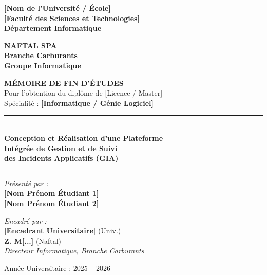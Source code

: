 \begin{titlepage}
\begin{center}

\begin{minipage}{0.45\textwidth}
    \begin{flushleft}
        \textbf{[Nom de l'Université / École]} \\
        \textbf{[Faculté des Sciences et Technologies]} \\
        \textbf{Département Informatique}
    \end{flushleft}
\end{minipage}
\hfill
\begin{minipage}{0.45\textwidth}
    \begin{flushright}
        \textbf{NAFTAL SPA} \\
        \textbf{Branche Carburants} \\
        \textbf{Groupe Informatique}
    \end{flushright}
\end{minipage}

\vspace*{1.5cm}
{\Large \textbf{MÉMOIRE DE FIN D'ÉTUDES}} \\
\vspace{0.4cm}
{\large Pour l'obtention du diplôme de [Licence / Master]} \\
\vspace{0.4cm}
{\large Spécialité : \textbf{[Informatique / Génie Logiciel]}}
\vspace*{1.5cm}

\rule{\textwidth}{1.5pt} \\
\vspace{0.5cm}
{\LARGE \textbf{Conception et Réalisation d'une Plateforme\\
Intégrée de Gestion et de Suivi\\
des Incidents Applicatifs (GIA)}} \\
\vspace{0.5cm}
\rule{\textwidth}{1.5pt}

\vspace*{1.5cm}

\begin{minipage}{0.45\textwidth}
    \begin{flushleft} \large
        \emph{Présenté par :} \\
        \textbf{[Nom Prénom Étudiant 1]} \\
        \textbf{[Nom Prénom Étudiant 2]}
    \end{flushleft}
\end{minipage}
\hfill
\begin{minipage}{0.45\textwidth}
    \begin{flushright} \large
        \emph{Encadré par :} \\
        \textbf{[Encadrant Universitaire]} (Univ.) \\
        \textbf{Z. M[...]} (Naftal) \\
        \textit{Directeur Informatique, Branche Carburants}
    \end{flushright}
\end{minipage}

\vfill
{\large Année Universitaire : 2025 -- 2026}
\end{center}
\end{titlepage}
